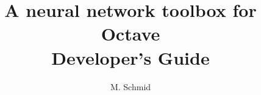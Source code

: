 
\title{A neural network toolbox for Octave\\
			Developer's Guide\\
			  }

\author{M. Schmid}
\maketitle
